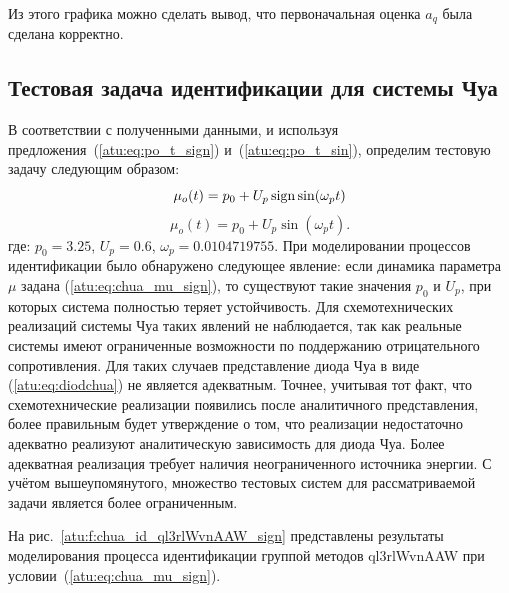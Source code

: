 Из этого графика можно сделать вывод, что первоначальная оценка $a_q$
была сделана корректно.

\subsection{Тестовая задача идентификации для системы Чуа}  %

В соответствии с полученными данными, и используя
предложения~(\ref{atu:eq:po_t_sign}) и~(\ref{atu:eq:po_t_sin}),
определим тестовую задачу следующим образом:
%
\begin{equation}
 \mu_o(t) = p_0 + U_p \operatorname*{sign} \sin( \omega_p t )
  \label{atu:eq:chua_mu_sign}
\end{equation}
%
\begin{equation}
 \mu_o(t) = p_0 + U_p \sin( \omega_p t ).
  \label{atu:eq:chua_mu_sin}
\end{equation}
%
где:
$p_0 = 3.25$, $U_p=0.6$, $\omega_p=0.0104719755$.
При моделировании процессов идентификации было обнаружено
следующее явление: если динамика параметра $\mu$ задана (\ref{atu:eq:chua_mu_sign}),
то существуют такие значения $p_0$ и $U_p$,
при которых система полностью теряет устойчивость.
Для схемотехнических реализаций системы Чуа таких явлений
не наблюдается, так как реальные системы имеют ограниченные возможности
по поддержанию отрицательного сопротивления. Для таких случаев
представление диода Чуа в виде (\ref{atu:eq:diodchua})
не является адекватным. Точнее, учитывая тот факт,
что схемотехнические реализации появились после аналитичного представления,
более правильным будет утверждение о том, что реализации недостаточно адекватно
реализуют аналитическую зависимость для диода Чуа.
Более адекватная реализация требует наличия неограниченного
источника энергии. С учётом вышеупомянутого,
множество тестовых систем для рассматриваемой задачи
является более ограниченным.

На рис.~\ref{atu:f:chua_id_ql3rlWvnAAW_sign} представлены результаты
моделирования процесса идентификации
группой методов ql3rlWvnAAW при условии~(\ref{atu:eq:chua_mu_sign}).

